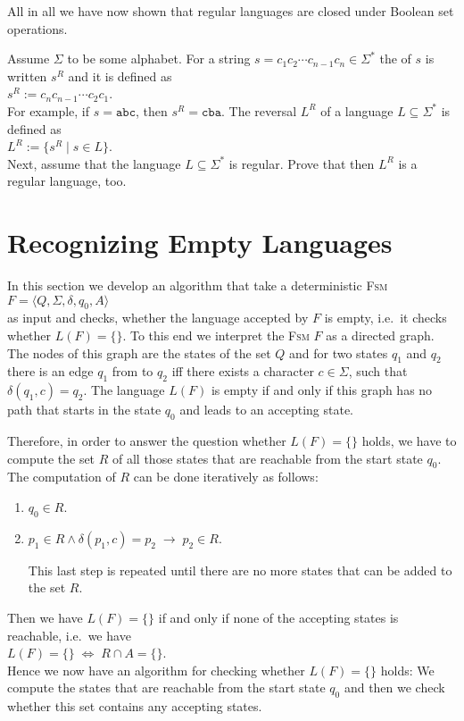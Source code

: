 All in all we have now shown that regular languages are closed under Boolean set operations.

\exerciseEng
Assume $\Sigma$ to be some alphabet.  For a string $s=c_1 c_2 \cdots c_{n-1} c_n \in \Sigma^*$ the
 
of $s$ is written $s^R$ and it is defined as
\\[0.2cm]
\hspace*{1.3cm}
$s^R := c_n c_{n-1} \cdots c_2 c_1$.
\\[0.2cm]
For example, if $s = \mathtt{abc}$, then $s^R = \mathtt{cba}$. The reversal $L^R$ of a language 
$L \subseteq \Sigma^*$ is defined as 
\\[0.2cm]
\hspace*{1.3cm}
$L^R := \{ s^R \mid s \in L \}$.
\\[0.2cm]
Next, assume that the language $L \subseteq \Sigma^*$ is regular.  Prove that then $L^R$ is a regular
language, too. \eox

\section{Recognizing Empty Languages \label{section:leer}}
In this section we develop an algorithm that take a deterministic \textsc{Fsm}
\\[0.2cm]
\hspace*{1.3cm}
$F = \langle Q, \Sigma, \delta, q_0, A \rangle$
\\[0.2cm]
as input and checks, whether the language accepted by $F$ is empty, i.e.~it checks whether 
$L(F) = \{\}$.  To this end we interpret the \textsc{Fsm} $F$ as a directed graph.  The nodes of this graph are the
states of the set $Q$ and for two states $q_1$ and
$q_2$ there is an edge  $q_1$ from to $q_2$ iff there exists a character $c \in \Sigma$, such that $\delta(q_1,
c) = q_2$.  
The language $L(F)$ is empty if and only if this graph has no path that starts in the state
$q_0$ and leads to an accepting state.

Therefore, in order to answer the question whether $L(F) = \{\}$ holds, we have to compute the set $R$
of all those states that are reachable from the start state $q_0$.  The computation of $R$ can be done
iteratively as follows:
\begin{enumerate}
\item $q_0 \in R$.
\item $p_1 \in R \wedge \delta(p_1,c) = p_2 \;\rightarrow\; p_2 \in R$.

      This last step is repeated until there are no more states that can be added to the set $R$.
\end{enumerate}
Then we have $L(F) = \{\}$ if and only if none of the accepting states is reachable, i.e.~we have
\\[0.2cm]
\hspace*{1.3cm}
$L(F) = \{\} \;\Leftrightarrow\; R \cap A = \{\}$.
\\[0.2cm]
Hence we now have an algorithm for checking whether $L(F) = \{\}$ holds:
We compute the states that are reachable from the start state $q_0$ and then we check whether this set
contains any accepting states.

